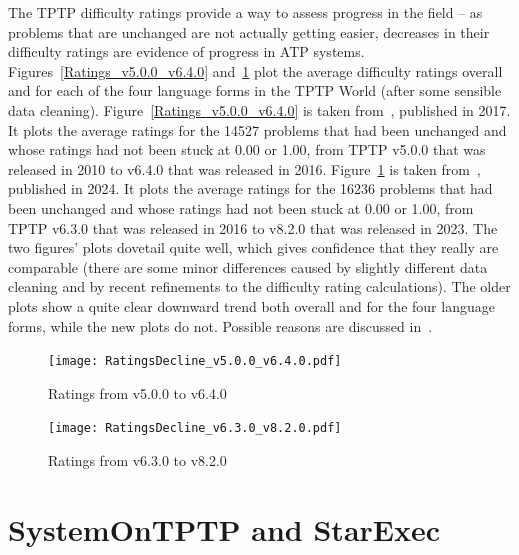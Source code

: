 \documentclass[runningheads]{llncs}
\begin{document}
The TPTP difficulty ratings provide a way to assess progress in the field -- as problems that 
are unchanged are not actually getting easier, decreases in their difficulty ratings are evidence 
of progress in ATP systems.
Figures~\ref{Ratings_v5.0.0_v6.4.0} and~\ref{Ratings_v6.3.0_v8.2.0} plot the average difficulty
ratings overall and for each of the four language forms in the TPTP World (after some sensible
data cleaning).
Figure~\ref{Ratings_v5.0.0_v6.4.0} is taken from~\cite{Sut17}, published in 2017.
It plots the average ratings for the 14527 problems that had been unchanged and whose ratings 
had not been stuck at 0.00 or 1.00, from TPTP v5.0.0 that was released in 2010 to v6.4.0 that was
released in 2016. 
Figure~\ref{Ratings_v6.3.0_v8.2.0} is taken from~\cite{SK+24}, published in 2024.
It plots the average ratings for the 16236 problems that had been unchanged and whose ratings 
had not been stuck at 0.00 or 1.00, from TPTP v6.3.0 that was released in 2016 to v8.2.0 that was
released in 2023. 
The two figures’ plots dovetail quite well, which gives confidence that they really are 
comparable (there are some minor differences caused by slightly different data cleaning 
and by recent refinements to the difficulty rating calculations). 
The older plots show a quite clear downward trend both overall and for the four language forms, 
while the new plots do not. 
Possible reasons are discussed in~\cite{SK+24}.

\begin{figure}[t!]
\centering
\begin{minipage}[t]{.49\textwidth}
  \centering
  \texttt{[image: RatingsDecline\_v5.0.0\_v6.4.0.pdf]}
  \vspace*{-2em}
  \caption{Ratings from v5.0.0 to v6.4.0}
  \label{Ratings_v5.0.0_v6.4.0}
\end{minipage}
\begin{minipage}[t]{.49\textwidth}
  \centering
  \texttt{[image: RatingsDecline\_v6.3.0\_v8.2.0.pdf]}
  \vspace*{-2em}
  \caption{Ratings from v6.3.0 to v8.2.0}
  \label{Ratings_v6.3.0_v8.2.0}
\end{minipage}
\end{figure}


\section{SystemOnTPTP and StarExec}
\label{StarExec}
\end{document}
